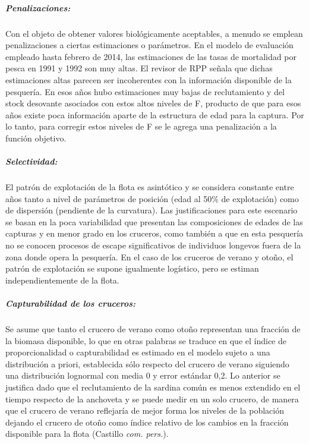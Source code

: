 \documentclass[
  spanish,
]{article}
\begin{document}
\normalsize

\hypertarget{penalizaciones}{%
\subparagraph{Penalizaciones:}\label{penalizaciones}}

Con el objeto de obtener valores biológicamente aceptables, a menudo se
emplean penalizaciones a ciertas estimaciones o parámetros. En el modelo
de evaluación empleado hasta febrero de 2014, las estimaciones de las
tasas de mortalidad por pesca en 1991 y 1992 son muy altas. El revisor
de RPP señala que dichas estimaciones altas parecen ser incoherentes con
la información disponible de la pesquería. En esos años hubo
estimaciones muy bajas de reclutamiento y del stock desovante asociados
con estos altos niveles de F, producto de que para esos años existe poca
información aparte de la estructura de edad para la captura. Por lo
tanto, para corregir estos niveles de F se le agrega una penalización a
la función objetivo.

\hypertarget{selectividad}{%
\subparagraph{Selectividad:}\label{selectividad}}

El patrón de explotación de la flota es asintótico y se considera
constante entre años tanto a nivel de parámetros de posición (edad al
50\% de explotación) como de dispersión (pendiente de la curvatura). Las
justificaciones para este escenario se basan en la poca variabilidad que
presentan las composiciones de edades de las capturas y en menor grado
en los cruceros, como también a que en esta pesquería no se conocen
procesos de escape significativos de individuos longevos fuera de la
zona donde opera la pesquería. En el caso de los cruceros de verano y
otoño, el patrón de explotación se supone igualmente logístico, pero se
estiman independientemente de la flota.

\hypertarget{capturabilidad-de-los-cruceros}{%
\subparagraph{Capturabilidad de los
cruceros:}\label{capturabilidad-de-los-cruceros}}

Se asume que tanto el crucero de verano como otoño representan una
fracción de la biomasa disponible, lo que en otras palabras se traduce
en que el índice de proporcionalidad o capturabilidad es estimado en el
modelo sujeto a una distribución a priori, establecida sólo respecto del
crucero de verano siguiendo una distribución lognormal con media 0 y
error estándar 0,2. Lo anterior se justifica dado que el reclutamiento
de la sardina común es menos extendido en el tiempo respecto de la
anchoveta y se puede medir en un solo crucero, de manera que el crucero
de verano reflejaría de mejor forma los niveles de la población dejando
el crucero de otoño como índice relativo de los cambios en la fracción
disponible para la flota (Castillo \emph{com. pers.}).
\end{document}
